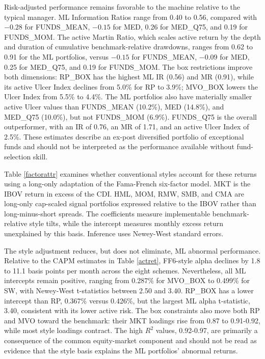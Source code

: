 \documentclass[preprint,12pt,authoryear]{elsarticle}
\begin{document}
Risk-adjusted performance remains favorable to the machine relative to the typical manager. ML Information Ratios range from 0.40 to 0.56, compared with $-0.28$ for FUNDS\_MEAN, $-0.15$ for MED, 0.26 for MED\_Q75, and 0.19 for FUNDS\_MOM. The active Martin Ratio, which scales active return by the depth and duration of cumulative benchmark-relative drawdowns, ranges from 0.62 to 0.91 for the ML portfolios, versus $-0.15$ for FUNDS\_MEAN, $-0.09$ for MED, 0.25 for MED\_Q75, and 0.19 for FUNDS\_MOM. The box restrictions improve both dimensions: RP\_BOX has the highest ML IR (0.56) and MR (0.91), while its active Ulcer Index declines from 5.0\% for RP to 3.9\%; MVO\_BOX lowers the Ulcer Index from 5.5\% to 4.4\%. The ML portfolios also have materially smaller active Ulcer values than FUNDS\_MEAN (10.2\%), MED (14.8\%), and MED\_Q75 (10.0\%), but not FUNDS\_MOM (6.9\%). FUNDS\_Q75 is the overall outperformer, with an IR of 0.76, an MR of 1.71, and an active Ulcer Index of 2.5\%. These estimates describe an ex-post diversified portfolio of exceptional funds and should not be interpreted as the performance available without fund-selection skill.

Table \ref{factorattr} examines whether conventional styles account for these returns using a long-only adaptation of the Fama-French six-factor model. MKT is the IBOV return in excess of the CDI. HML, MOM, RMW, SMB, and CMA are long-only cap-scaled signal portfolios expressed relative to the IBOV rather than long-minus-short spreads. The coefficients measure implementable benchmark-relative style tilts, while the intercept measures monthly excess return unexplained by this basis. Inference uses Newey-West standard errors.

The style adjustment reduces, but does not eliminate, ML abnormal performance. Relative to the CAPM estimates in Table \ref{actret}, FF6-style alpha declines by 1.8 to 11.1 basis points per month across the eight schemes. Nevertheless, all ML intercepts remain positive, ranging from 0.287\% for MVO\_BOX to 0.499\% for SW, with Newey-West t-statistics between 2.50 and 3.40. RP\_BOX has a lower intercept than RP, 0.367\% versus 0.426\%, but the largest ML alpha t-statistic, 3.40, consistent with its lower active risk. The box constraints also move both RP and MVO toward the benchmark: their MKT loadings rise from 0.87 to 0.91-0.92, while most style loadings contract. The high $R^2$ values, 0.92-0.97, are primarily a consequence of the common equity-market component and should not be read as evidence that the style basis explains the ML portfolios' abnormal returns.
\end{document}
